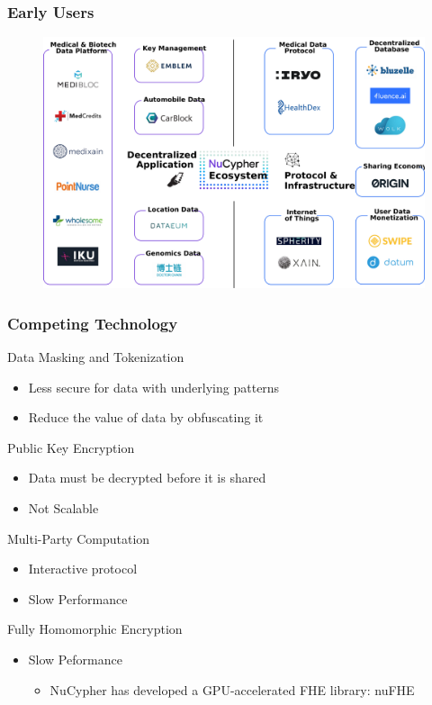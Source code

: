 \documentclass[xetex,mathsans,sans,aspectratio=169]{beamer}
\begin{document}
    \begin{frame}
      \frametitle{Early Users}
      \begin{figure}
           \includegraphics[width=11.5cm]{pdf/projects.pdf}
      \end{figure}
    \end{frame}

    \begin{frame}
      \frametitle{Competing Technology}
       Data Masking and Tokenization
       \begin{itemize}
           \item Less secure for data with underlying patterns
           \item Reduce the value of data by obfuscating it
       \end{itemize}

       Public Key Encryption
       \begin{itemize}
           \item Data must be decrypted before it is shared
           \item Not Scalable
       \end{itemize}

       Multi-Party Computation
       \begin{itemize}
           \item Interactive protocol
           \item Slow Performance
       \end{itemize}

       Fully Homomorphic Encryption
       \begin{itemize}
           \item Slow Peformance
           \begin{itemize}
               \item NuCypher has developed a GPU-accelerated FHE library: nuFHE
           \end{itemize}
       \end{itemize}
     \end{frame}
\end{document}
